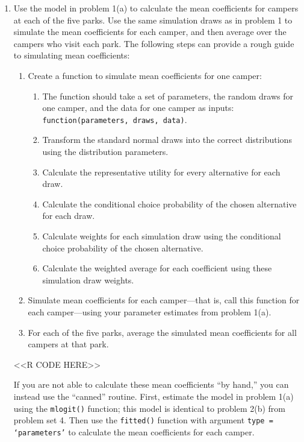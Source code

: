 \documentclass[11pt,letterpaper]{article}
\begin{document}
\begin{enumerate}[label=\alph*., leftmargin=*]
	\item Use the model in problem 1(a) to calculate the mean coefficients for campers at each of the five parks. Use the same simulation draws as in problem 1 to simulate the mean coefficients for each camper, and then average over the campers who visit each park. The following steps can provide a rough guide to simulating mean coefficients:
	\begin{enumerate}[label=\Roman*.]
		\item Create a function to simulate mean coefficients for one camper:
		\begin{enumerate}[label=\roman*.]
			\item The function should take a set of parameters, the random draws for one camper, and the data for one camper as inputs: \texttt{function(parameters, draws, data)}.
			\item Transform the standard normal draws into the correct distributions using the distribution parameters.
			\item Calculate the representative utility for every alternative for each draw.
			\item Calculate the conditional choice probability of the chosen alternative for each draw.
			\item Calculate weights for each simulation draw using the conditional choice probability of the chosen alternative.
			\item Calculate the weighted average for each coefficient using these simulation draw weights.
		\end{enumerate}
		\item Simulate mean coefficients for each camper---that is, call this function for each camper---using your parameter estimates from problem 1(a).
		\item For each of the five parks, average the simulated mean coefficients for all campers at that park.
	\end{enumerate}

	<<R CODE HERE>>

	If you are not able to calculate these mean coefficients ``by hand,'' you can instead use the ``canned'' routine. First, estimate the model in problem 1(a) using the \texttt{mlogit()} function; this model is identical to problem 2(b) from problem set 4. Then use the \texttt{fitted()} function with argument \texttt{type = `parameters'} to calculate the mean coefficients for each camper.


\end{enumerate}
\end{document}

